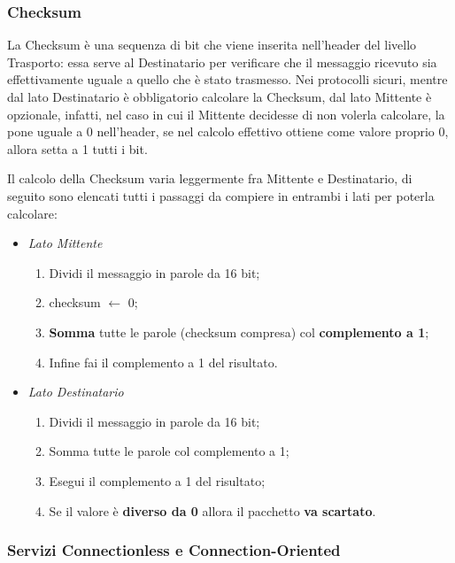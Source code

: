 \documentclass[a4paper]{article}
\begin{document}
					
			\subsubsection{Checksum}
			\label{sec:checksum}	
			
				La Checksum è una sequenza di bit che viene inserita nell'header del livello Trasporto: essa serve al Destinatario per verificare che il messaggio ricevuto sia effettivamente uguale a quello che è stato trasmesso. Nei protocolli sicuri, mentre dal lato Destinatario è obbligatorio calcolare la Checksum, dal lato Mittente è opzionale, infatti, nel caso in cui il Mittente decidesse di non volerla calcolare, la pone uguale a 0 nell'header, se nel calcolo effettivo ottiene come valore proprio 0, allora setta a 1 tutti i bit.
				
				Il calcolo della Checksum varia leggermente fra Mittente e Destinatario, di seguito sono elencati tutti i passaggi da compiere in entrambi i lati per poterla calcolare:
				\begin{itemize}
					\item \emph{Lato Mittente}
						\begin{enumerate}
							\item Dividi il messaggio in parole da 16 bit;
							\item checksum $ \leftarrow $ 0;
							\item \textbf{Somma} tutte le parole (checksum compresa) col \textbf{complemento a 1};
							\item Infine fai il complemento a 1 del risultato.
						\end{enumerate}
					\item \emph{Lato Destinatario}
						\begin{enumerate}
							\item Dividi il messaggio in parole da 16 bit;
							\item Somma tutte le parole col complemento a 1;
							\item Esegui il complemento a 1 del risultato;
							\item Se il valore è \textbf{diverso da 0} allora il pacchetto \textbf{va scartato}.
						\end{enumerate}
				\end{itemize}						
					
				
			\subsubsection{Servizi Connectionless e Connection-Oriented}
			
\end{document}

